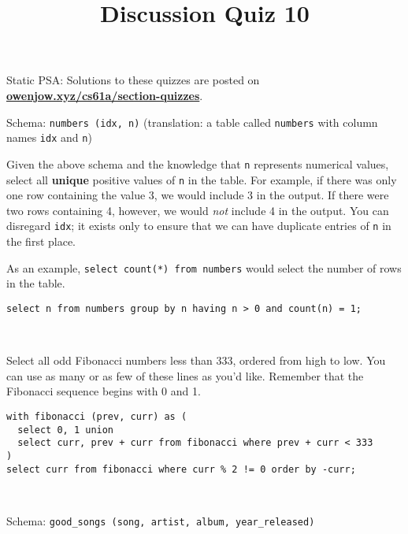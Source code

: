 \documentclass[twoside]{article}
\title{\sc Discussion Quiz 10 \solution{Solutions}}
\begin{document}
\thispagestyle{empty}
\maketitle

\hfill Static PSA: Solutions to these quizzes are posted on \textbf{\href{http://owenjow.xyz/cs61a/section-quizzes}{owenjow.xyz/cs61a/section-quizzes}}.

\begin{enumerate}

Schema: \texttt{numbers (idx, n)} (translation: a table called \texttt{numbers} with column names \texttt{idx} and \texttt{n})

Given the above schema and the knowledge that \texttt{n} represents numerical values, select all \textbf{unique} positive values of \texttt{n} in the table. For example, if there was only one row containing the value 3, we would include 3 in the output. If there were two rows containing 4, however, we would \textit{not} include 4 in the output. You can disregard \texttt{idx}; it exists only to ensure that we can have duplicate entries of \texttt{n} in the first place.

As an example, \texttt{select count(*) from numbers} would select the number of rows in the table.\\

\begin{lstlisting}
select n from numbers group by n having n > 0 and count(n) = 1;
\end{lstlisting}

~


Select all odd Fibonacci numbers less than 333, ordered from high to low. You can use as many or as few of these lines as you'd like. Remember that the Fibonacci sequence begins with 0 and 1.\\

\begin{lstlisting}
with fibonacci (prev, curr) as (
  select 0, 1 union
  select curr, prev + curr from fibonacci where prev + curr < 333
)
select curr from fibonacci where curr % 2 != 0 order by -curr;
\end{lstlisting}

~


Schema: \texttt{good\_songs (song, artist, album, year\_released)}


\end{enumerate}
\end{document}
